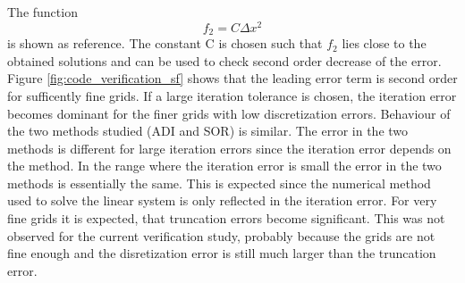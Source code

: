 %
The function 
\begin{equation}
f_2 = C \Delta x^2
\end{equation}
is shown as reference. The constant C is chosen such that $f_2$ lies close to the obtained solutions and can be used to check second order decrease of the error.  Figure \ref{fig:code_verification_sf} shows that the leading error term is second order for sufficently fine grids. If a large iteration tolerance is chosen, the iteration error becomes dominant for the finer grids with low discretization errors.  Behaviour of the two methods studied (ADI and SOR) is similar. The error in the two methods is different for large iteration errors since the iteration error depends on the method. In the range where the iteration error is small the error in the two methods is essentially the same. This is expected since the numerical method used to solve the linear system is only reflected in the iteration error. For very fine grids it is expected, that truncation errors become significant. This was not observed for the current verification study, probably because the grids are not fine enough and the disretization error is still much larger than the truncation error.
%
%

